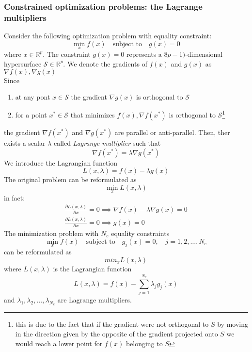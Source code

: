 \documentclass{book}
\begin{document}
\subsubsection{Constrained optimization problems: the Lagrange multipliers}
Consider the following optimization problem with equality constraint: 
\[
    \min_xf(x)\quad\text{subject to}\quad g(x)=0
\]
where $x\in \mathbb{R}^p$. The constraint $g(x)=0$ represents a $8p-1)$-dimensional hypersurface
$\mathcal{S}\in \mathbb{R}^p$. We denote the gradients of $f(x)$ and $g(x)$ as $\nabla f(x), \nabla g(x)$\\
Since 
\begin{enumerate}
    \item at any pont $x\in\mathcal{S}$ the gradient $\nabla g(x)$ is orthogonal to $\mathcal{S}$ 
    \item for a point $x^*\in \mathcal{S}$ that minimizes $f(x),\nabla f(x^*)$ is orthogonal to $\mathcal{S}$\footnote{this is due to the fact that if the gradient were not orthogonal to $S$ by moving in the direction given by the opposite of the gradient projected onto $S$ we would reach a lower point for $f(x)$ belonging to $S$}
\end{enumerate}
the gradient $\nabla f(x^*)$ and $\nabla g(x^*)$ are parallel or anti-parallel. Then, ther exists a scalar $\lambda$ called \emph{Lagrange multiplier} such that 
\[
    \nabla f(x^*)=\lambda\nabla g(x^*)
\]
We introduce the Lagrangian function 
\[
    L(x,\lambda)=f(x)-\lambda g(x)
\]
The original problem can be reformulated as 
\[
    \min_x L(x,\lambda)
\]
in fact: 
\begin{gather*}
    \displaystyle\frac{\partial L(x,\lambda)}{\partial x}=0 \implies \nabla f(x)-\lambda\nabla g(x)=0\\
    \displaystyle\frac{\partial L(x,\lambda)}{\partial x}=0 \implies g(x)=0
\end{gather*}
The minimization problem with $N_e$ equality constraints 
\[
    \min_x f(x) \quad \text{subject to}\quad g_j(x)=0, \quad j=1,2,\dots,N_e
\]
can be reformulated as 
\[
    min_x L(x,\lambda)
\]
where $L(x,\lambda)$ is the Lagrangian function 
\[
    L(x,\lambda)= f(x)-\displaystyle\sum_{j=1}^{N_e}\lambda_jg_j(x)
\]
and $\lambda_1,\lambda_2,\dots,\lambda_{N_e}$ are Lagrange multipliers.
\end{document}
